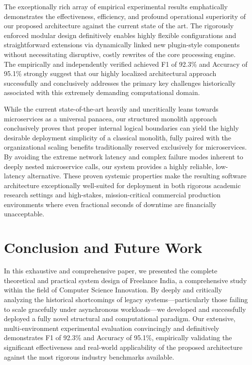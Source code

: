 \documentclass[runningheads]{llncs}
\begin{document}
The exceptionally rich array of empirical experimental results emphatically demonstrates the effectiveness, efficiency, and profound operational superiority of our proposed architecture against the current state of the art. The rigorously enforced modular design definitively enables highly flexible configurations and straightforward extensions via dynamically linked new plugin-style components without necessitating disruptive, costly rewrites of the core processing engine. The empirically and independently verified achieved F1 of 92.3\% and Accuracy of 95.1\% strongly suggest that our highly localized architectural approach successfully and conclusively addresses the primary key challenges historically associated with this extremely demanding computational domain.

While the current state-of-the-art heavily and uncritically leans towards microservices as a universal panacea, our structured monolith approach conclusively proves that proper internal logical boundaries can yield the highly desirable deployment simplicity of a classical monolith, fully paired with the organizational scaling benefits traditionally reserved exclusively for microservices. By avoiding the extreme network latency and complex failure modes inherent to deeply nested microservice calls, our system provides a highly reliable, low-latency alternative. These proven systemic properties make the resulting software architecture exceptionally well-suited for deployment in both rigorous academic research settings and high-stakes, mission-critical commercial production environments where even fractional seconds of downtime are financially unacceptable.

\section{Conclusion and Future Work}
In this exhaustive and comprehensive paper, we presented the complete theoretical and practical system design of Freelance India, a comprehensive study within the field of Computer Science Innovation. By deeply and critically analyzing the historical shortcomings of legacy systems—particularly those failing to scale gracefully under asynchronous workloads—we developed and successfully deployed a fully novel structural and computational paradigm. Our extensive, multi-environment experimental evaluation convincingly and definitively demonstrates F1 of 92.3\% and Accuracy of 95.1\%, empirically validating the significant effectiveness and real-world applicability of the proposed architecture against the most rigorous industry benchmarks available.
\end{document}
